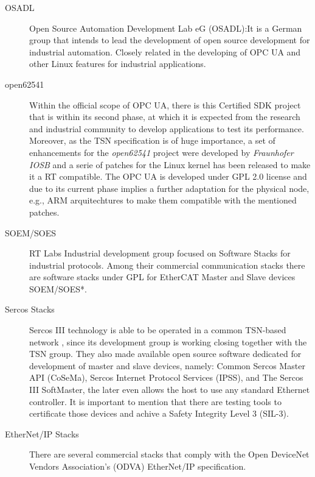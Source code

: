 \begin{description}
    \item[OSADL] Open Source Automation Development Lab eG (OSADL):It is a German group that intends to lead the development of open source development
    for industrial automation. Closely related in the developing of OPC UA and other Linux features for industrial applications.
    \item[open62541] Within the official scope of OPC UA, there is this Certified SDK project that is within its second phase, at which it is expected 
    from the research and industrial community to develop applications to test its performance. Moreover, as the TSN specification is of huge importance, 
    a set of enhancements for the \emph{open62541} project were developed by \emph{Fraunhofer IOSB} and a serie of patches for the Linux kernel has been released to 
    make it a RT compatible.\cite{open62541_homepage} %
    The OPC UA is developed under GPL 2.0 license and due to its current phase implies a further adaptation for the physical node, e.g., ARM arquitechtures 
    to make them compatible with the mentioned patches. 
    \item[SOEM/SOES] RT Labs Industrial development group focused on Software Stacks for industrial protocols. Among their commercial communication stacks
    there are software stacks under GPL for EtherCAT Master and Slave devices SOEM/SOES*. \cite{soesm_homepage} %
    \item[Sercos Stacks] Sercos III technology is able to be operated in a common TSN-based network \cite{sercos_tsn}, %
    since its development group is working closing together with the TSN group. 
    They also made available open source software dedicated for development of master and slave devices, namely: Common Sercos Master API (CoSeMa),
    Sercos Internet Protocol Services (IPSS), and The Sercos III SoftMaster, the later even allows the host to use any standard Ethernet controller.\cite{sercos_stacks} %
    It is important to mention that there are testing tools to certificate those devices and achive a Safety Integrity Level 3 (SIL-3).
    \item[EtherNet/IP Stacks] There are several commercial stacks that comply with the Open DeviceNet Vendors Association's (ODVA) EtherNet/IP specification. 

\end{description}
